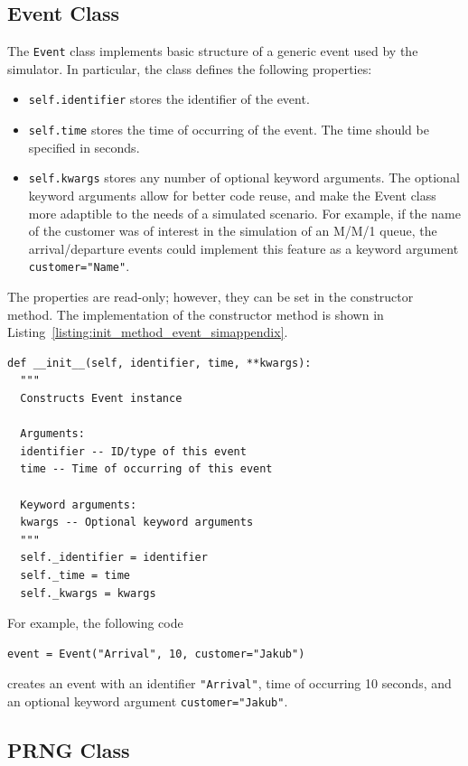 \subsection{Event Class}
\label{sub:event_class_simappendix}
The \lstinline{Event} class implements basic structure of a generic event used by the simulator. In particular, the class defines the following properties:
\begin{itemize}
\item \lstinline{self.identifier} stores the identifier of the event.
\item \lstinline{self.time} stores the time of occurring of the event. The time should be specified in seconds. 
\item \lstinline{self.kwargs} stores any number of optional keyword arguments. The optional keyword arguments allow for better code reuse, and make the Event class more adaptible to the needs of a simulated scenario. For example, if the name of the customer was of interest in the simulation of an M/M/1 queue, the arrival/departure events could implement this feature as a keyword argument \lstinline{customer="Name"}.
\end{itemize}
The properties are read-only; however, they can be set in the constructor method. The implementation of the constructor method is shown in Listing~\ref{listing:init_method_event_simappendix}.
\begin{lstlisting}[caption=\lstinline{__init__(identifier, time, **kwargs)} member method of the \lstinline{Event} class, label=listing:init_method_event_simappendix]
def __init__(self, identifier, time, **kwargs):
  """
  Constructs Event instance
  
  Arguments:
  identifier -- ID/type of this event
  time -- Time of occurring of this event

  Keyword arguments:
  kwargs -- Optional keyword arguments
  """
  self._identifier = identifier
  self._time = time
  self._kwargs = kwargs
\end{lstlisting}
For example, the following code
\begin{lstlisting}[nolol, frame=none, numbers=none]
event = Event("Arrival", 10, customer="Jakub")
\end{lstlisting}
creates an event with an identifier \lstinline{"Arrival"}, time of occurring 10 seconds, and an optional keyword argument \lstinline{customer="Jakub"}.

\subsection{PRNG Class}
\label{sub:prng_class_simappendix}

